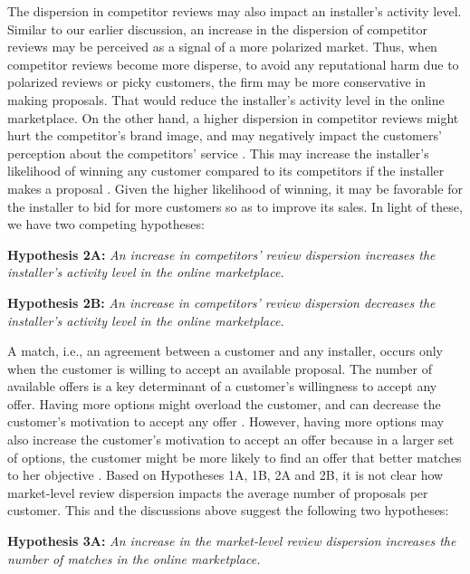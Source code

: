 \documentclass[msom,blindrev]{informs3}
\begin{document}
	The dispersion in competitor reviews may also impact an installer's activity level. Similar to our earlier discussion, an increase in the dispersion of competitor reviews may be perceived as a signal of a more polarized market. Thus, when competitor reviews become more disperse, to avoid any reputational harm due to polarized reviews or picky customers, the firm may be more conservative in making proposals. That would reduce the installer's activity level in the online marketplace. On the other hand, a higher dispersion in competitor reviews might hurt the competitor's brand image, and may negatively impact the customers' perception about the competitors' service \citep{chakraborty2018credibility,chakraborty2018effects,Zhu}. This may increase the installer's likelihood of winning any customer compared to its competitors if the installer makes a proposal \citep{demirag2011risks,moreno2014doing}. Given the higher likelihood of winning, it may be favorable for the installer to bid for more customers so as to improve its sales. In light of these, we have two competing hypotheses:
	
	
	\noindent\textbf{Hypothesis 2A:} \emph{An increase in competitors' review dispersion increases the installer's activity level in the online marketplace.}
	
	\noindent\textbf{Hypothesis 2B:} \emph{An increase in competitors' review dispersion decreases the installer's activity level in the online marketplace.}
	
	A match, i.e., an agreement between a customer and any installer, occurs only when the customer is willing to accept an available proposal. The number of available offers is a key determinant of a customer's willingness to accept any offer. Having more options might overload the customer, and can decrease the customer's motivation to accept any offer \citep{scheibehenne2010can,iyengar2000choice}. However, having more options may also increase the customer's motivation to accept an offer because in a larger set of options, the customer  might be more likely to find an offer that better matches to her objective \citep{scheibehenne2010can,baumol1956variety}. Based on Hypotheses 1A, 1B, 2A and 2B, it is not clear how market-level review dispersion impacts the average number of proposals per customer. This and the discussions above  suggest the following two hypotheses:
	
	
	\noindent\textbf{Hypothesis 3A:} \emph{An increase in the market-level review dispersion increases the number of matches in the online marketplace.}
	
\end{document}
